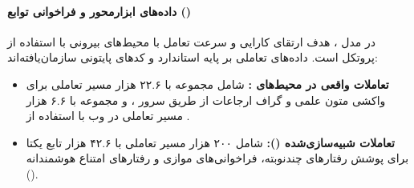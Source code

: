 \paragraph*{داده‌های ابزارمحور و فراخوانی توابع ()}
در مدل ، هدف ارتقای کارایی و سرعت تعامل با محیط‌های بیرونی با استفاده از پروتکل  است. داده‌های تعاملی بر پایه استاندارد  و کدهای پایتونی سازمان‌یافته‌اند:
\begin{itemize}
    \item \textbf{تعاملات واقعی در محیط‌های :} شامل مجموعه  با ۲۲.۶ هزار مسیر تعاملی برای واکشی متون علمی و گراف ارجاعات از طریق سرور ، و مجموعه  با ۶.۶ هزار مسیر تعاملی در وب با استفاده از .
    \item \textbf{تعاملات شبیه‌سازی‌شده ():} شامل ۲۰۰ هزار مسیر تعاملی با ۴۲.۶ هزار تابع یکتا برای پوشش رفتارهای چندنوبته، فراخوانی‌های موازی و رفتارهای امتناع هوشمندانه ().
\end{itemize}

\begin{table}[htbp]
\centering
\caption{ویژگی‌های آماری دادگان فراخوانی توابع در }
\label{tab:olmo3_tool_use}
\end{table}

